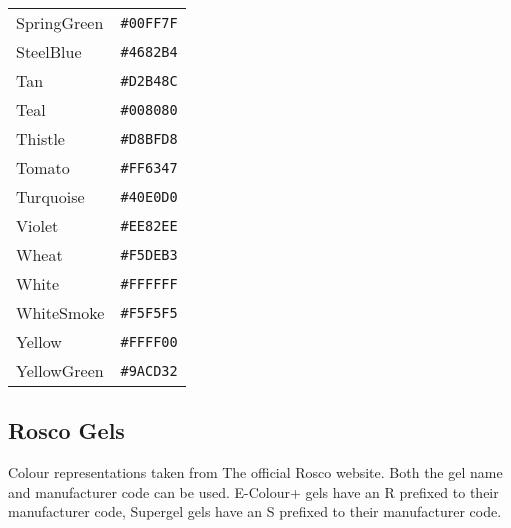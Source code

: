 \documentclass[a4paper]{article}
\begin{document}
\begin{longtable}{|l|r|}
SpringGreen & \texttt{\#00FF7F} \cellcolor[HTML]{00FF7F} \\
SteelBlue & \texttt{\#4682B4} \cellcolor[HTML]{4682B4} \\
Tan & \texttt{\#D2B48C} \cellcolor[HTML]{D2B48C} \\
Teal & \texttt{\#008080} \cellcolor[HTML]{008080} \\
Thistle & \texttt{\#D8BFD8} \cellcolor[HTML]{D8BFD8} \\
Tomato & \texttt{\#FF6347} \cellcolor[HTML]{FF6347} \\
Turquoise & \texttt{\#40E0D0} \cellcolor[HTML]{40E0D0} \\
Violet & \texttt{\#EE82EE} \cellcolor[HTML]{EE82EE} \\
Wheat & \texttt{\#F5DEB3} \cellcolor[HTML]{F5DEB3} \\
White & \texttt{\#FFFFFF} \cellcolor[HTML]{FFFFFF} \\
WhiteSmoke & \texttt{\#F5F5F5} \cellcolor[HTML]{F5F5F5} \\
Yellow & \texttt{\#FFFF00} \cellcolor[HTML]{FFFF00} \\
YellowGreen & \texttt{\#9ACD32} \cellcolor[HTML]{9ACD32} \\
\hline
\end{longtable}

\subsection{Rosco Gels}
Colour representations taken from The official Rosco website. Both the gel name 
and manufacturer code can be used. E-Colour+ gels have an R prefixed to their 
manufacturer code, Supergel gels have an S prefixed to their manufacturer code.
\end{document}
